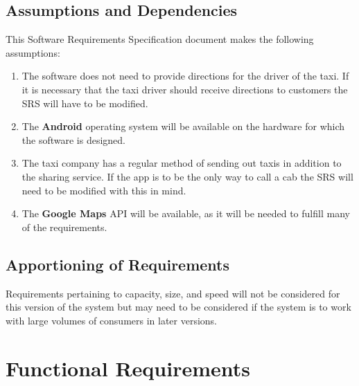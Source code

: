\documentclass[english]{article}
\begin{document}
\subsection{Assumptions and Dependencies}
\label{sub:assumptions_and_dependencies}
This Software Requirements Specification document makes the following assumptions:
\begin{enumerate}
	\item The software does not need to provide directions for the driver of the taxi. If it is necessary that the taxi driver should receive directions to customers the SRS will have to be modified.
	\item The  \textbf{Android} operating system will be available on the hardware for which the software is designed.
	\item The taxi company has a regular method of sending out taxis in addition to the sharing service. If the app is to be the only way to call a cab the SRS will need to be modified with this in mind.
	\item The \textbf{Google Maps} API will be available, as it will be needed to fulfill many of the requirements.
\end{enumerate}

\subsection{Apportioning of Requirements}
\label{sub:apportioning_of_requirements}
Requirements pertaining to capacity, size, and speed will not be considered for this version of the system but may need to be considered if the system is to work with large volumes of consumers in later versions. 


\section{Functional Requirements}
\label{sec:functional_requirements}
\end{document}
